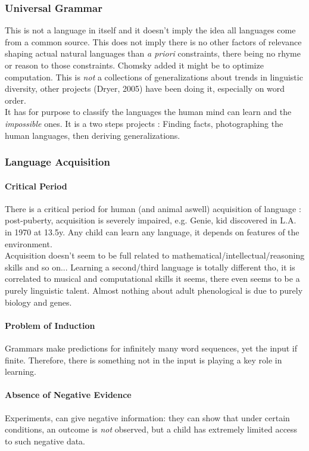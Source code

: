 \documentclass{cours}
\begin{document}
\subsubsection{Universal Grammar}
This is not a language in itself and it doesn't imply the idea all languages come from a common source. This does not imply there is no other factors of relevance shaping actual natural languages than \textsl{a priori} constraints, there being no rhyme or reason to those constraints. Chomsky added it might be to optimize computation. This is \emph{not} a collections of generalizations about trends in linguistic diversity, other projects (Dryer, 2005) have been doing it, especially on word order. \\
It has for purpose to classify the languages the human mind can learn and the \textit{impossible} ones. It is a two steps projects\! : Finding facts, photographing the human languages, then deriving generalizations.

\subsubsection{Language Acquisition}
\paragraph{Critical Period}
There is a critical period for human (and animal aswell) acquisition of language\! : post-puberty, acquisition is severely impaired, e.g. Genie, kid discovered in L.A. in 1970 at 13.5y. Any child can learn any language, it depends on features of the environment.\\
Acquisition doesn't seem to be full related to mathematical/intellectual/reasoning skills and so on... Learning a second/third language is totally different tho, it is correlated to musical and computational skills it seems, there even seems to be a purely linguistic talent. Almost nothing about adult phenological is due to purely biology and genes. 

\paragraph{Problem of Induction}
Grammars make predictions for infinitely many word sequences, yet the input if finite. Therefore, there is something not in the input is playing a key role in learning. 

\paragraph{Absence of Negative Evidence}
Experiments, can give negative information\!: they can show that under certain conditions, an outcome is \emph{not} observed, but a child has extremely limited access to such negative data.
\end{document}
